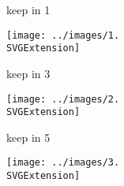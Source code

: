 


\label{0}

keep in 1 

\begin{minipage}{0.25000\textwidth}
\begin{center}
\texttt{[image: ../images/1.\\SVGExtension]}
\end{center}
\raggedright{}
\end{minipage}\vspace{0.75cm}





keep in 3 

\begin{minipage}{0.25000\textwidth}
\begin{center}
\texttt{[image: ../images/2.\\SVGExtension]}
\end{center}
\raggedright{}
\end{minipage}\vspace{0.75cm}





keep in 5 

\begin{minipage}{0.25000\textwidth}
\begin{center}
\texttt{[image: ../images/3.\\SVGExtension]}
\end{center}
\raggedright{}
\end{minipage}\vspace{0.75cm}






